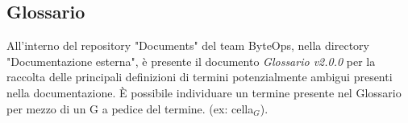 \subsection{Glossario}
All'interno del repository "Documents" del team ByteOps, nella directory "Documentazione esterna", è presente il documento \textit{Glossario v2.0.0} per la raccolta delle principali definizioni di termini potenzialmente ambigui presenti nella documentazione.
È possibile individuare un termine presente nel Glossario per mezzo di un G a pedice del termine. (ex: cella\(_G\)).
\vspace{0.1cm}
